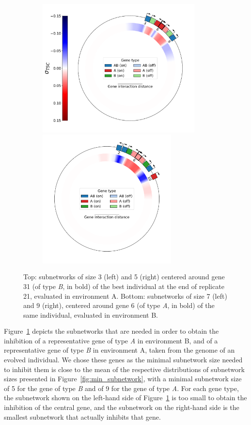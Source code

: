 \begin{figure}[H]
  \begin{subfigure}[t]{\textwidth}
    \centering
    \includegraphics[height=7cm]{ploscb/img/sub_7_genes_03_env_B.pdf}
    \hspace{-0.5cm}
    \includegraphics[height=7cm]{ploscb/img/sub_9_genes_02_env_B.pdf}
  \end{subfigure}
  \caption{Top: subnetworks of size 3 (left) and 5 (right) centered around gene 31 (of type \emph{B}, in bold) of the best individual at the end of replicate 21, evaluated in environment A.
  Bottom: subnetworks of size 7 (left) and 9 (right), centered around gene 6 (of type \emph{A}, in bold) of the same individual, evaluated in environment B.
  }
  \label{fig:subnetwork_examples}
\end{figure}

Figure~\ref{fig:subnetwork_examples} depicts the subnetworks that are needed in order to obtain the inhibition of a representative gene of type \emph{A} in environment B, and of a representative gene of type \emph{B} in environment A, taken from the genome of an evolved individual.
We chose these genes as the minimal subnetwork size needed to inhibit them is close to the mean of the respective distributions of subnetwork sizes presented in Figure~\ref{fig:min_subnetwork}, with a minimal subnetwork size of 5 for the gene of type \emph{B}  and of 9 for the gene of type \emph{A}.
For each gene type, the subnetwork shown on the left-hand side of Figure~\ref{fig:subnetwork_examples} is too small to obtain the inhibition of the central gene, and the subnetwork on the right-hand side is the smallest subnetwork that actually inhibits that gene.

